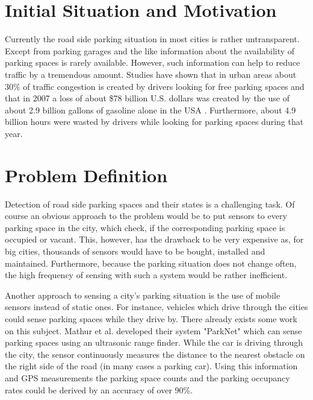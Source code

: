 \documentclass[11pt,a4paper,titlepage,
chapterprefix,headsepline,parskip,pdftex,
,pointlessnumbers,bibtotoc]{article}
\begin{document}


%
%
%
%

\newpage
{}

\section{Initial Situation and Motivation}
Currently the road side parking situation in most cities is rather untransparent. Except from parking garages and the like information about the availability of parking spaces is rarely available. However, such information can help to reduce traffic by a tremendous amount. Studies have shown that in urban areas about 30\% of traffic congestion is created by drivers looking for free parking spaces \cite{Nawaz:2013:PSB:2500423.2500438} and that in 2007 a loss of about \$78 billion U.S. dollars was created by the use of about 2.9 billion gallons of gasoline alone in the USA \cite{TexasMobilityReport}. Furthermore, about 4.9 billion hours were wasted by drivers while looking for parking spaces during that year. 

\section{Problem Definition}

Detection of road side parking spaces and their states is a challenging task. Of course an obvious approach to the problem would be to put sensors to every parking space in the city, which check, if the corresponding parking space is occupied or vacant. This, however, has the drawback to be very expensive as, for big cities, thousands of sensors would have to be bought, installed and maintained. Furthermore, because the parking situation does not change often, the high frequency of sensing with such a system would be rather inefficient.

Another approach to sensing a city's parking situation is the use of mobile sensors instead of static ones.
For instance, vehicles which drive through the cities could sense parking spaces while they drive by. There already exists some work on this subject. Mathur et al. \cite{Mathur:2010:PDS:1814433.1814448} developed their system "ParkNet" which can sense parking spaces using an ultrasonic range finder. 
While the car is driving through the city, the sensor continuously measures the distance to the nearest obstacle on the right side of the road (in many cases a parking car). Using this information and GPS measurements the parking space counts and the parking occupancy rates could be derived by an accuracy of over 90\%.
\end{document}
